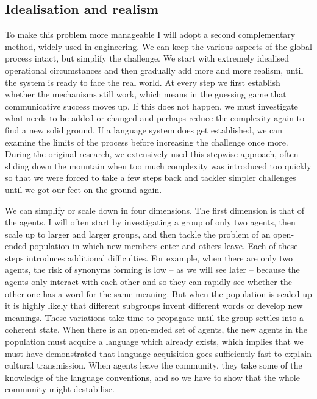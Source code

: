 \subsection{Idealisation and realism}

To make this problem more manageable I will 
adopt a second complementary method, widely used in
engineering. We can keep the various
aspects of the global process intact, but simplify the challenge. 
We start with extremely idealised operational circumstances
and then gradually add more and more realism, until the system is 
ready to face the real world. At every step we first establish
whether the mechanisms still work, which means in the guessing
game that communicative success moves up. If this does not happen, 
we must investigate what needs to be added or changed and perhaps
reduce the complexity again to find a new solid ground. 
If a language system does get established, we can examine 
the limits of the process before increasing the challenge once more.
During the original research, 
we extensively used this stepwise approach, often sliding down the 
mountain when too much complexity was introduced too quickly so 
that we were forced to take a few steps back and tackler simpler 
challenges until we got our feet on the ground again. 

We can simplify or scale down in four dimensions. 
The first dimension is that of the agents. I 
will often start by investigating a group of only two agents, then scale up
to larger and larger groups, 
and then tackle the problem of an open-ended population in which 
new members enter and others leave. Each of these steps 
introduces additional difficulties. For example, when there are
only two agents, the risk of synonyms forming is low -- as we 
will see later -- because the agents only interact with each 
other and so they can rapidly see whether the other one has
a word for the same meaning. But when the population is scaled up 
it is highly likely that different subgroups invent 
different words or develop new meanings.
These variations take time to propagate until
the group settles into a coherent state. 
When there is an open-ended set of agents, the new agents
in the population must acquire a language which already 
exists, which implies that we must have demonstrated that language 
acquisition goes sufficiently fast to explain cultural 
transmission. When agents leave the community, they take some
of the knowledge of the language conventions, and so we have 
to show that the whole community might destabilise. 

